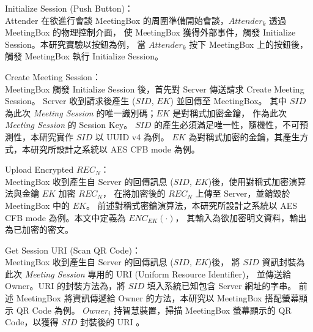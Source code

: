 \begin{steps}
    \item Initialize Session (Push Button)：\\
        Attender 在欲進行會談 MeetingBox 的周圍準備開始會談，$Attender_{k}$ 透過 MeetingBox 的物理控制介面，
        使 MeetingBox 獲得外部事件，觸發 Initialize Session。本研究實驗以按鈕為例，
        當 $Attender_{k}$ 按下 MeetingBox 上的按鈕後，觸發 MeetingBox 執行 Initialize Session。

    \item Create Meeting Session：\\
        MeetingBox 觸發 Initialize Session 後，首先對 Server 傳送請求 Create Meeting Session。
        Server 收到請求後產生 ($SID$, $EK$) 並回傳至 MeetingBox。
        其中 $SID$ 為此次 {\it Meeting Session} 的唯一識別碼；$EK$ 是對稱式加密金鑰，
        作為此次 {\it Meeting Session} 的 Session Key。
        $SID$ 的產生必須滿足唯一性，隨機性，不可預測性，本研究實作 $SID$ 以 UUID v4 為例。
        $EK$ 為對稱式加密的金鑰，其產生方式，本研究所設計之系統以 AES CFB mode 為例。

    \item Upload Encrypted $REC_{N}$：\\
        MeetingBox 收到產生自 Server 的回傳訊息 ($SID$, $EK$)後，使用對稱式加密演算法與金鑰 $EK$ 加密 $REC_{N}$，
        在將加密後的 $REC_{N}$ 上傳至 Server，並銷毀於 MeetingBox 中的 $EK$。
        前述對稱式密鑰演算法，本研究所設計之系統以 AES CFB mode 為例。本文中定義為 $ENC_{EK}(·)$，
        其輸入為欲加密明文資料，輸出為已加密的密文。

    \item Get Session URI (Scan QR Code)：\\
        MeetingBox 收到產生自 Server 的回傳訊息 ($SID$, $EK$)後，
        將 $SID$ 資訊封裝為此次 {\it Meeting Session} 專用的 URI (Uniform Resource Identifier)，
        並傳送給 Owner。URI 的封裝方法為，將 $SID$ 填入系統已知包含 Server 網址的字串。
        前述 MeetingBox 將資訊傳遞給 Owner 的方法，本研究以 MeetingBox 搭配螢幕顯示 QR Code 為例。
        $Owner_{i}$ 持智慧裝置，掃描 MeetingBox 螢幕顯示的 QR Code，以獲得 $SID$ 封裝後的 URI 。


\end{steps}
